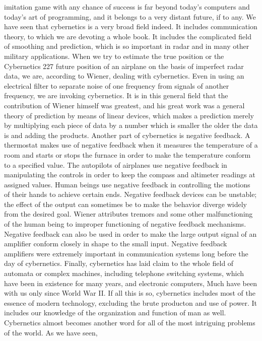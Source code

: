 {{{{{{{{{{{imitation game with any chance of success is far beyond today’s
computers and today’s art of programming, and it belongs to a very
distant future, if to any.
We have seen that cybernetics is a very broad field indeed. It
includes communication theory, to which we are devoting a whole
book. It includes the complicated field of smoothing and prediction,
which is so important in radar and in many other military
applications. When we try to estimate the true position or the
Cybernetics 227
future position of an airplane on the basis of imperfect radar data,
we are, according to Wiener, dealing with cybernetics. Even in
using an electrical filter to separate noise of one frequency from
signals of another frequency, we are invoking cybernetics.
It is in this general field that the contribution of Wiener himself
was greatest, and his great work was a general theory of prediction
by means of linear devices, which makes a prediction merely by
multiplying each piece of data by a number which is smaller the
older the data is and adding the products.
Another part of cybernetics is negative feedback. A thermostat
makes use of negative feedback when it measures the temperature
of a room and starts or stops the furnace in order to make the
temperature conform to a specified value. The autopilots of airplanes
use negative feedback in manipulating the controls in order
to keep the compass and altimeter readings at assigned values.
Human beings use negative feedback in controlling the motions
of their hands to achieve certain ends.
Negative feedback devices can be unstable; the effect of the
output can sometimes be to make the behavior diverge widely
from the desired goal. Wiener attributes tremors and some other
malfunctioning of the human being to improper functioning of
negative feedback mechanisms.
Negative feedback can also be used in order to make the large
output signal of an amplifier conform closely in shape to the small
input. Negative feedback amplifiers were extremely important in
communication systems long before the day of cybernetics.
Finally, cybernetics has laid claim to the whole field of automata
or complex machines, including telephone switching systems,
which have been in existence for many years, and electronic
computers, Much have been with us only since World War II.
If all this is so, cybernetics includes most of the essence of
modern technology, excluding the brute producton and use of
power. It includes our knowledge of the organization and function
of man as well. Cybernetics almost becomes another word for all of
the most intriguing problems of the world. As we have seen,
}}}}}}}}}}}

